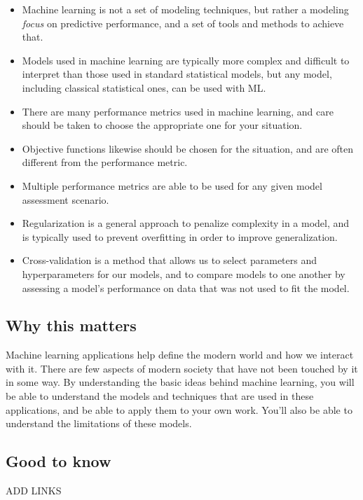 \documentclass[
  letterpaper,
]{krantz}
\providecommand{\tightlist}{%
  \setlength{\itemsep}{0pt}\setlength{\parskip}{0pt}}\usepackage{longtable,booktabs,array}
\begin{document}
\begin{itemize}
\tightlist
\item
  Machine learning is not a set of modeling techniques, but rather a
  modeling \emph{focus} on predictive performance, and a set of tools
  and methods to achieve that.
\item
  Models used in machine learning are typically more complex and
  difficult to interpret than those used in standard statistical models,
  but any model, including classical statistical ones, can be used with
  ML.
\item
  There are many performance metrics used in machine learning, and care
  should be taken to choose the appropriate one for your situation.
\item
  Objective functions likewise should be chosen for the situation, and
  are often different from the performance metric.
\item
  Multiple performance metrics are able to be used for any given model
  assessment scenario.
\item
  Regularization is a general approach to penalize complexity in a
  model, and is typically used to prevent overfitting in order to
  improve generalization.
\item
  Cross-validation is a method that allows us to select parameters and
  hyperparameters for our models, and to compare models to one another
  by assessing a model's performance on data that was not used to fit
  the model.
\end{itemize}

\subsection{Why this matters}\label{why-this-matters}

Machine learning applications help define the modern world and how we
interact with it. There are few aspects of modern society that have not
been touched by it in some way. By understanding the basic ideas behind
machine learning, you will be able to understand the models and
techniques that are used in these applications, and be able to apply
them to your own work. You'll also be able to understand the limitations
of these models.

\subsection{Good to know}\label{good-to-know}

ADD LINKS
\end{document}
